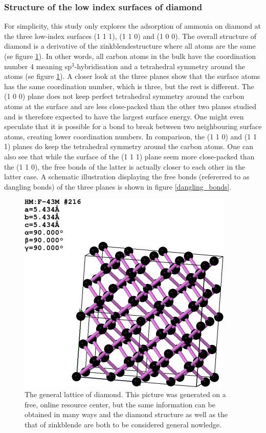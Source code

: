 \documentclass[10pt,a4paper]{article}
\begin{document}
\subsubsection{Structure of the low index surfaces of diamond}
For simplicity, this study only explores the adsorption of ammonia on diamond at the three low-index surfaces (1 1 1), (1 1 0) and (1 0 0). The overall structure of diamond is a derivative of the zinkblendestructure where all atoms are the same (se figure \ref{diamond_general}). In other words, all carbon atoms in the bulk have the coordination number 4 meaning sp$^3$-hybridisation and a tetrahedral symmetry around the atoms  (se figure \ref{diamond_general}). A closer look at the three planes show that the surface atoms has the same coordination number, which is three, but the rest is different. The (1 0 0) plane does not keep perfect tetrahedral symmetry around the carbon atoms at the surface and are less close-packed than the other two planes studied and is therefore expected to have the largest surface energy.  One might even speculate that it is possible for a bond to break between two neighbouring surface atoms, creating lower coordination numbers. In comparison, the (1 1 0) and (1 1 1) planes do keep the tetrahedral symmetry around the carbon atoms. One can also see that while the surface of the (1 1 1) plane seem more close-packed than the (1 1 0), the free bonds of the latter is actually closer to each other in the latter case. A schematic illustration displaying the free bonds (refererred to as dangling bonds) of the three planes is shown in figure  \ref{dangling_bonds}. 

\begin{figure} \captionsetup{width=.8\linewidth} \caption{The general lattice of diamond. This picture was generated on a free, online resource center, but the same information can be obtained in many ways and the diamond structure as well as the that of zinkblende are both to be considered general nowledge.} \label{diamond_general}
\includegraphics[width=.8\linewidth]{pictures/diamond_general.png}
\end{figure} 
\end{document}
